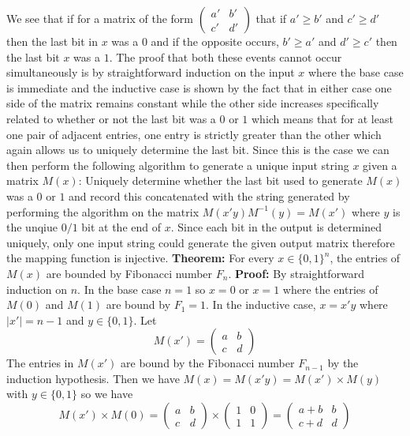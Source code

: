 \documentclass[12pt]{article}
\begin{document}
We see that if for a matrix of the form 
$\left(\begin{array}{cc} a' & b' \\ c' & d' \end{array}\right)$ that if
$a' \ge b'$ and $c' \ge d'$ then the last bit in $x$ was a $0$ and if
the opposite occurs, $b' \ge a'$ and $d' \ge c'$ then the last bit $x$ was
a $1$. The proof that both these events cannot occur simultaneously is by
straightforward induction on the input $x$ where the base case is immediate and
the inductive case is shown by the fact that in either case one side of the
matrix remains constant while the other side increases specifically related
to whether or not the last bit was a $0$ or $1$ which means that for at least
one pair of adjacent entries, one entry is strictly greater than the other which
again allows us to uniquely determine the last bit. Since this is the case we can
then perform the following algorithm to generate a unique input string $x$ given
a matrix $M(x)$: Uniquely determine whether the last bit used to generate $M(x)$
was a $0$ or $1$ and record this concatenated with the string generated by
performing the algorithm on the matrix $M(x'y)M^{-1}(y) = M(x')$ where $y$ is
the unqiue $0/1$ bit at the end of $x$. Since each bit in the output is determined
uniquely, only one input string could generate the given output matrix therefore
the mapping function is injective.
\vspace{2mm}
\newline
\textbf{Theorem:} For every $x \in \{0,1\}^n$, the entries of $M(x)$ are bounded
by Fibonacci number $F_n$.
\newline
\textbf{Proof:} By straightforward induction on $n$. In the base case $n = 1$ so
$x = 0$ or $x = 1$ where the entries of $M(0)$ and $M(1)$ are bound by $F_1 = 1$.
In the inductive case, $x = x'y$ where $|x'| = n-1$ and $y \in \{0,1\}$. Let
$$M(x') = \left(\begin{array}{cc} a & b \\ c & d \end{array}\right)$$
The entries in $M(x')$ are bound by the Fibonacci number $F_{n-1}$ by the
induction hypothesis. Then we have
$M(x) = M(x'y) = M(x') \times M(y)$ with $y\in \{0,1\}$ so we have
$$M(x') \times M(0) =
\left(\begin{array}{cc} a & b \\ c & d \end{array}\right) \times
\left(\begin{array}{cc} 1 & 0 \\ 1 & 1 \end{array}\right) =
\left(\begin{array}{cc} a+b & b \\ c+d & d \end{array}\right)$$
\end{document}
